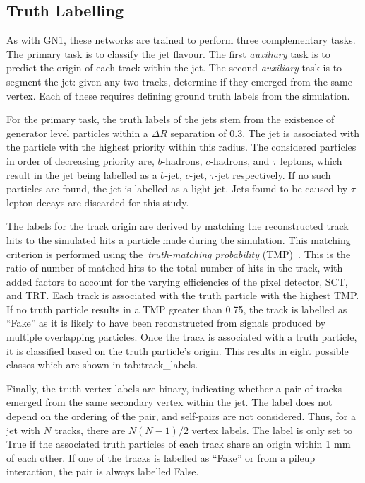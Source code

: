 \subsection{Truth Labelling}

As with \Gls{GN1}, these networks are trained to perform three complementary tasks.
The primary task is to classify the jet flavour.
The first \textit{auxiliary} task is to predict the origin of each track within the jet.
The second \textit{auxiliary} task is to segment the jet: given any two tracks, determine if they emerged from the same vertex.
Each of these requires defining ground truth labels from the simulation.

For the primary task, the truth labels of the jets stem from the existence of generator level particles within a $\Delta R$ separation of 0.3.
The jet is associated with the particle with the highest priority within this radius.
The considered particles in order of decreasing priority are, $b$-hadrons, $c$-hadrons, and $\tau$ leptons, which result in the jet being labelled as a $b$-jet, $c$-jet, $\tau$-jet respectively.
If no such particles are found, the jet is labelled as a light-jet.
Jets found to be caused by $\tau$ lepton decays are discarded for this study.

The labels for the track origin are derived by matching the reconstructed track hits to the simulated hits a particle made during the \geant simulation.
This matching criterion is performed using the~\textit{truth-matching probability} (TMP)~\cite{PerformanceATLASTrack}.
This is the ratio of number of matched hits to the total number of hits in the track, with added factors to account for the varying efficiencies of the pixel detector, SCT, and TRT\@.
Each track is associated with the truth particle with the highest TMP\@.
If no truth particle results in a TMP greater than 0.75, the track is labelled as ``Fake'' as it is likely to have been reconstructed from signals produced by multiple overlapping particles.
Once the track is associated with a truth particle, it is classified based on the truth particle's origin.
This results in eight possible classes which are shown in \Cref
{tab:track_labels}.

Finally, the truth vertex labels are binary, indicating whether a pair of tracks emerged from the same secondary vertex within the jet.
The label does not depend on the ordering of the pair, and self-pairs are not considered.
Thus, for a jet with $N$ tracks, there are $N(N-1)/2$ vertex labels.
The label is only set to True if the associated truth particles of each track share an origin within $1~\mm$ of each other.
If one of the tracks is labelled as ``Fake'' or from a pileup interaction, the pair is always labelled False.

